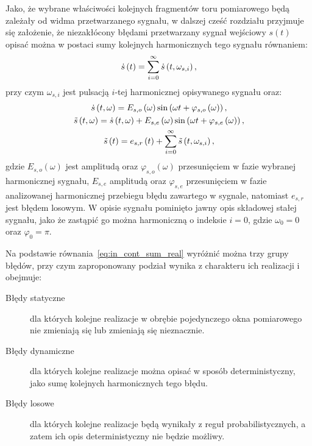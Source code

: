 Jako, że wybrane właściwości kolejnych fragmentów toru pomiarowego będą zależały od widma przetwarzanego sygnału, w dalszej cześć rozdziału przyjmuje się założenie, że niezakłócony błędami przetwarzany sygnał wejściowy $s(t)$ opisać można w postaci sumy kolejnych harmonicznych tego sygnału równaniem:
\begin{equation}
\dot{s} \left(t\right) = \sum _{i = 0} ^{\infty} \dot{s} \left( t, \omega_{s,i} \right) \label{eq:in_cont_sum},
\end{equation}
przy czym $\omega_{s,i}$ jest pulsacją $i$-tej harmonicznej opisywanego sygnału oraz:
\begin{gather}
\dot{s} \left( t, \omega \right) = E_{s,o} \left(\omega\right) \sin \left( \omega t + \varphi_{s,o} \left(\omega\right) \right) \label{eq:in_cont_omega_ideal}, \\
\tilde{s} \left( t, \omega \right) = \dot{s} \left( t, \omega \right) + E_{s,e} \left(\omega\right) \sin \left( \omega t + \varphi_{s,e} \left(\omega\right) \right) \label{eq:in_cont_omega_real}, \\
\tilde{s} \left(t\right) = e_{s,r} \left(t\right) + \sum _{i = 0} ^{\infty} \tilde{s} \left( t, \omega_{s,i} \right) \label{eq:in_cont_sum_real},
\end{gather}
gdzie $E_{s,o}(\omega)$ jest amplitudą oraz $\varphi_{s,o}(\omega)$ przesunięciem w fazie wybranej harmonicznej sygnału, $E_{s,e}$ amplitudą oraz $ \varphi_{s,e}$ przesunięciem w fazie analizowanej harmonicznej przebiegu błędu zawartego w sygnale, natomiast $e_{s,r}$ jest błędem losowym. W opisie sygnału pominięto jawny opis składowej stałej sygnału, jako że zastąpić go można harmoniczną o indeksie $i = 0$, gdzie $\omega_{0} = 0$ oraz $\varphi_{0} = \pi$.

Na podstawie równania~\eqref{eq:in_cont_sum_real} wyróżnić można trzy grupy błędów, przy czym zaproponowany podział wynika z charakteru ich realizacji i obejmuje:
\begin{description}
\item [Błędy statyczne] dla których kolejne realizacje w obrębie pojedynczego okna pomiarowego nie zmieniają się lub zmieniają się nieznacznie.
\item [Błędy dynamiczne] dla których kolejne realizacje można opisać w sposób deterministyczny, jako sumę kolejnych harmonicznych tego błędu.
\item [Błędy losowe] dla których kolejne realizacje będą wynikały z reguł probabilistycznych, a zatem ich opis deterministyczny nie będzie możliwy.
\end{description}

